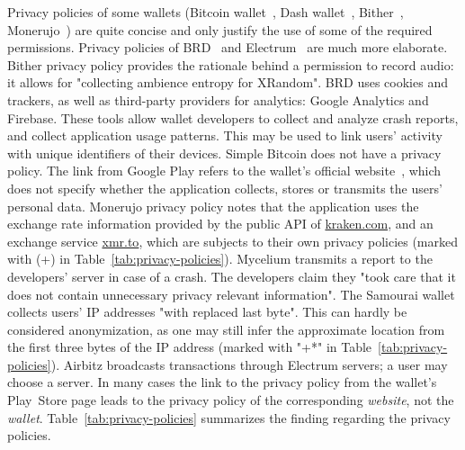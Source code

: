 Privacy policies of some wallets (Bitcoin wallet~\cite{BitcoinWalletPrivacyPolicy}, Dash wallet~\cite{DashWalletPrivacyPolicy}, Bither~\cite{BitherWalletPrivacyPolicy}, Monerujo~\cite{MonerujoPrivacyPolicy}) are quite concise and only justify the use of some of the required permissions.
Privacy policies of BRD~\cite{BRDPrivacyPolicy} and Electrum~\cite{ElectrumPrivacyPolicy} are much more elaborate.
Bither privacy policy provides the rationale behind a permission to record audio: it allows for "collecting ambience entropy for XRandom".
BRD uses cookies and trackers, as well as third-party providers for analytics: Google Analytics and Firebase.
These tools allow wallet developers to collect and analyze crash reports, and collect application usage patterns.
This may be used to link users' activity with unique identifiers of their devices.
Simple Bitcoin does not have a privacy policy.
The link from Google Play refers to the wallet's official website~\cite{SimpleBitcoin}, which does not specify whether the application collects, stores or transmits the users' personal data.
Monerujo privacy policy notes that the application uses the exchange rate information provided by the public API of \url{kraken.com}, and an exchange service \url{xmr.to}, which are subjects to their own privacy policies (marked with (+) in Table~\ref{tab:privacy-policies}).
Mycelium transmits a report to the developers' server in case of a crash.
The developers claim they "took care that it does not contain unnecessary privacy relevant information".
The Samourai wallet collects users' IP addresses "with replaced last byte".
This can hardly be considered anonymization, as one may still infer the approximate location from the first three bytes of the IP address (marked with "+*" in Table~\ref{tab:privacy-policies}).
Airbitz broadcasts transactions through Electrum servers; a user may choose a server.
In many cases the link to the privacy policy from the wallet's Play~Store page leads to the privacy policy of the corresponding \textit{website}, not the \textit{wallet}.
Table~\ref{tab:privacy-policies} summarizes the finding regarding the privacy policies.


